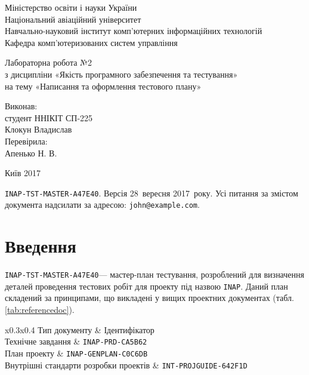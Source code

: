 \documentclass[a4paper,oneside,DIV=12,12pt]{scrartcl}
\newcommand\testplanid{\texttt{INAP-TST-MASTER-A47E40}}
\newcommand\projname{\texttt{INAP}}
\begin{document}
    \begin{titlepage}
    \begin{center}
	Міністерство освіти і науки України\\
	Національний авіаційний університет\\
	Навчально-науковий інститут комп'ютерних інформаційних технологій\\
	Кафедра комп'ютеризованих систем управління

	\vspace{\fill}

	Лабораторна робота №2\\
	з дисципліни «Якість програмного забезпечення та тестування»\\
	на тему «Написання та оформлення тестового плану»

	\vspace{\fill}
	
	\begin{flushright}
				Виконав:\\
				студент ННІКІТ СП-225\\
				Клокун Владислав\\
				Перевірила:\\
				Апенько Н. В.
	\end{flushright}

	Київ 2017

    \end{center}
    \end{titlepage}

	\noindent\testplanid. Версія 28~вересня 2017~року. Усі питання за змістом документа надсилати за адресою: \texttt{john@example.com}.
	
    \section{Введення}
		\testplanid --- мастер-план тестування, розроблений для визначення деталей проведення тестових робіт для проекту під назвою \projname. Даний план складений за принципами, що викладені у вищих проектних документах (табл. \ref{tab:referencedoc}).
	
		\begin{table}[h]
			\label{tab:referencedoc}
			\centering
			\begin{tabular}{x{0.3\textwidth}x{0.4\textwidth}}
				\toprule
				Тип документу & Ідентифікатор \\
				\midrule
				Технічне завдання & \texttt{INAP-PRD-CA5B62}\\
				План проекту & \texttt{INAP-GENPLAN-C0C6DB}\\
				Внутрішні стандарти розробки проектів & \texttt{INT-PROJGUIDE-642F1D}\\
				\bottomrule
			\end{tabular}
			\caption{Документи, на які спирається \testplanid}
		\end{table}
\end{document}

